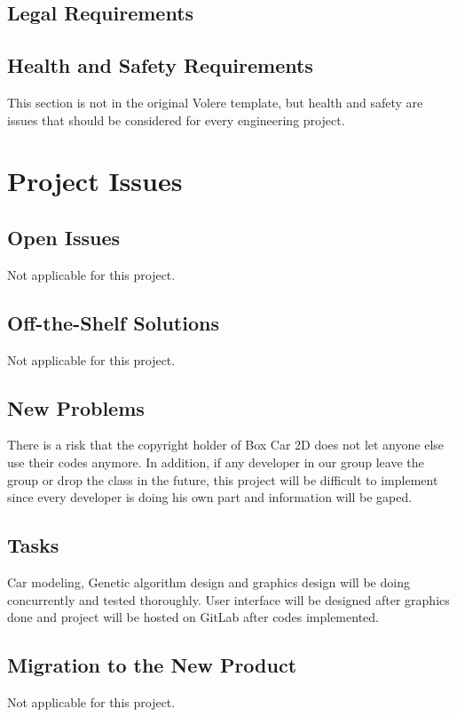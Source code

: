 \documentclass[12pt, titlepage]{article}
\begin{document}
\subsection{Legal Requirements}

\subsection{Health and Safety Requirements}

This section is not in the original Volere template, but health and safety are
issues that should be considered for every engineering project.

\section{Project Issues}

\subsection{Open Issues}
Not applicable for this project.

\subsection{Off-the-Shelf Solutions}
Not applicable for this project.

\subsection{New Problems}
There is a risk that the copyright holder of Box Car 2D does not let anyone
 else use their codes anymore. In addition, if any developer in our group 
leave the group or drop the class in the future, this project will be 
difficult to implement since every developer is doing his own part and
 information will be gaped.

\subsection{Tasks}
Car modeling, Genetic algorithm design and graphics design will be doing 
concurrently and tested thoroughly. User interface will be designed after 
graphics done and project will be hosted on GitLab after codes implemented.

\subsection{Migration to the New Product}
Not applicable for this project.
\end{document}
